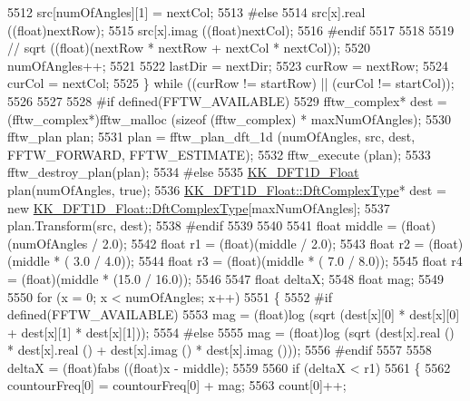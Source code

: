 \begin{DoxyCode}
5512       src[numOfAngles][1] = nextCol;
5513 \textcolor{preprocessor}{    #else}
5514       src[x].real ((\textcolor{keywordtype}{float})nextRow);
5515       src[x].imag ((\textcolor{keywordtype}{float})nextCol);
5516 \textcolor{preprocessor}{    #endif}
5517 
5518 
5519     \textcolor{comment}{// sqrt ((float)(nextRow * nextRow + nextCol * nextCol));}
5520     numOfAngles++;
5521  
5522     lastDir = nextDir;
5523     curRow = nextRow;
5524     curCol = nextCol;
5525   \}  \textcolor{keywordflow}{while}  ((curRow != startRow)  ||  (curCol != startCol));
5526 
5527 
5528 \textcolor{preprocessor}{  #if  defined(FFTW\_AVAILABLE)}
5529     fftw\_complex*   dest = (fftw\_complex*)fftw\_malloc (\textcolor{keyword}{sizeof} (fftw\_complex) * maxNumOfAngles);
5530     fftw\_plan       plan;
5531     plan = fftw\_plan\_dft\_1d (numOfAngles, src, dest, FFTW\_FORWARD, FFTW\_ESTIMATE);
5532     fftw\_execute (plan);
5533     fftw\_destroy\_plan(plan);  
5534 \textcolor{preprocessor}{  #else}
5535     \hyperlink{class_k_k_b_1_1_k_k___d_f_t1_d}{KK\_DFT1D\_Float}  plan(numOfAngles, \textcolor{keyword}{true});
5536     \hyperlink{class_k_k_b_1_1_k_k___d_f_t1_d_a4cbc827157dd30ddec2d3753e552a827}{KK\_DFT1D\_Float::DftComplexType}*  dest = \textcolor{keyword}{new} 
      \hyperlink{class_k_k_b_1_1_k_k___d_f_t1_d_a4cbc827157dd30ddec2d3753e552a827}{KK\_DFT1D\_Float::DftComplexType}[maxNumOfAngles];
5537     plan.Transform(src, dest);
5538 \textcolor{preprocessor}{  #endif}
5539 
5540 
5541   \textcolor{keywordtype}{float}  middle = (float)(numOfAngles / 2.0);
5542   \textcolor{keywordtype}{float}  r1 = (float)(middle / 2.0);
5543   \textcolor{keywordtype}{float}  r2 = (float)(middle * ( 3.0  /   4.0));
5544   \textcolor{keywordtype}{float}  r3 = (float)(middle * ( 7.0  /   8.0));
5545   \textcolor{keywordtype}{float}  r4 = (float)(middle * (15.0  /  16.0));
5546 
5547   \textcolor{keywordtype}{float}  deltaX;
5548   \textcolor{keywordtype}{float}  mag;
5549 
5550   \textcolor{keywordflow}{for}  (x = 0; x < numOfAngles; x++)
5551   \{
5552 \textcolor{preprocessor}{    #if  defined(FFTW\_AVAILABLE)}
5553       mag = (float)log (sqrt (dest[x][0] * dest[x][0] + dest[x][1] * dest[x][1]));
5554 \textcolor{preprocessor}{    #else}
5555       mag = (float)log (sqrt (dest[x].real () * dest[x].real () + dest[x].imag () * dest[x].imag ()));
5556 \textcolor{preprocessor}{    #endif}
5557 
5558     deltaX = (float)fabs ((\textcolor{keywordtype}{float})x - middle);
5559 
5560     \textcolor{keywordflow}{if}  (deltaX < r1)
5561     \{
5562       countourFreq[0] = countourFreq[0] + mag;
5563       count[0]++;

\end{DoxyCode}
